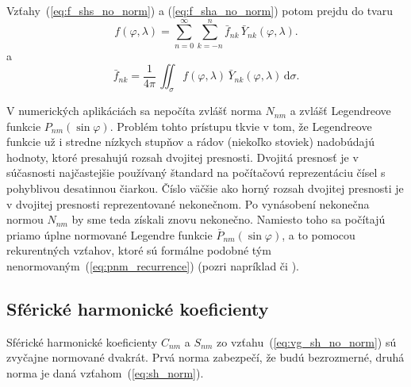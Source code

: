 \documentclass[a4paper, 12pt]{book}
\newcommand{\diff}{\mathrm d}
\begin{document}
Vzťahy~(\ref{eq:f_shs_no_norm}) a (\ref{eq:f_sha_no_norm}) potom prejdu do 
tvaru
%
\begin{equation}
\label{eq:f_shs}
f(\varphi, \lambda) = \sum_{n = 0}^\infty \sum_{k = -n}^n \bar{f}_{nk} \, 
\bar{Y}_{nk}(\varphi, \lambda){.}
\end{equation}
%
a
%
\begin{equation}
\label{eq:f_sha}
\bar{f}_{nk} = \frac{1}{4\pi} \, \iint_{\sigma} f(\varphi, \lambda) \, 
\bar{Y}_{nk}(\varphi, \lambda) \, \diff \sigma{.}
\end{equation}

V numerických aplikáciách sa nepočíta zvlášť norma $N_{nm}$ a zvlášť 
Legendreove funkcie $P_{nm}(\sin\varphi)$.  Problém tohto prístupu tkvie v tom, 
že Legendreove funkcie už i stredne nízkych stupňov a rádov (niekoľko stoviek) 
nadobúdajú hodnoty, ktoré presahujú rozsah dvojitej presnosti.  Dvojitá 
presnosť je v súčasnosti najčastejšie používaný štandard na počítačovú 
reprezentáciu čísel s pohyblivou desatinnou čiarkou.  Číslo väčšie ako horný 
rozsah dvojitej presnosti je v dvojitej presnosti reprezentované nekonečnom.  
Po vynásobení nekonečna normou $N_{nm}$ by sme teda získali znovu nekonečno.  
Namiesto toho sa počítajú priamo úplne normované Legendre funkcie 
$\bar{P}_{nm}(\sin\varphi)$, a to pomocou rekurentných vzťahov, ktoré sú 
formálne podobné tým nenormovaným~(\ref{eq:pnm_recurrence}) (pozri napríklad 
\citealt{Holmes2002a} či \citealt{Fukushima2012a}).



\subsection{Sférické harmonické koeficienty}

Sférické harmonické koeficienty $C_{nm}$ a $S_{nm}$ zo 
vzťahu~(\ref{eq:vg_sh_no_norm}) sú zvyčajne normované dvakrát.  Prvá norma 
zabezpečí, že budú bezrozmerné, druhá norma je daná vzťahom~(\ref{eq:sh_norm}).
\end{document}
